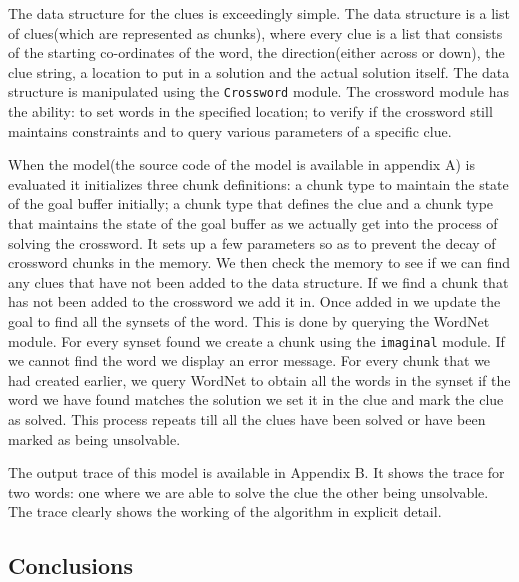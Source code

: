 The data structure for the clues is exceedingly simple. The data
structure is a list of clues(which are represented as chunks), where
every clue is a list that consists of the starting co-ordinates of the
word, the direction(either across or down), the clue string, a
location to put in a solution and the actual solution itself. The data
structure is manipulated using the \texttt{Crossword} module. The
crossword module has the ability: to set words in the specified
location; to verify if the crossword still maintains constraints and
to query various parameters of a specific clue.

When the model(the source code of the model is available in appendix
A) is evaluated it initializes three chunk definitions: a chunk type
to maintain the state of the goal buffer initially; a chunk type that
defines the clue and a chunk type that maintains the state of the goal
buffer as we actually get into the process of solving the
crossword. It sets up a few parameters so as to prevent the decay of
crossword chunks in the memory. We then check the memory to see if we
can find any clues that have not been added to the data structure. If
we find a chunk that has not been added to the crossword we add it
in. Once added in we update the goal to find all the synsets of the
word. This is done by querying the WordNet module. For every synset
found we create a chunk using the \texttt{imaginal} module. If we
cannot find the word we display an error message. For every chunk that
we had created earlier, we query WordNet to obtain all the words
in the synset if the word we have found matches the solution we set it
in the clue and mark the clue as solved. This process repeats till all
the clues have been solved or have been marked as being unsolvable.

The output trace of this model is available in Appendix B. It shows
the trace for two words: one where we are able to solve the clue the
other being unsolvable. The trace clearly shows the working of the
algorithm in explicit detail.

\subsection{Conclusions}

